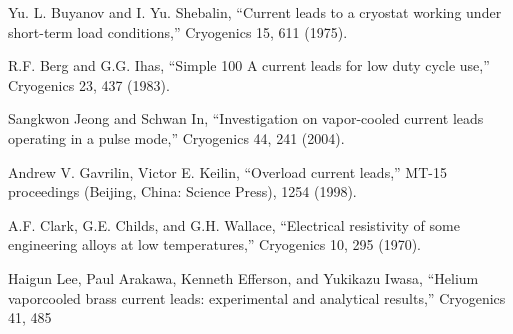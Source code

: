 \noindent [4.82] Yu. L. Buyanov and I. Yu. Shebalin, ``Current leads to a cryostat working under
short-term load conditions,” Cryogenics 15, 611 (1975).

\noindent [4.83] R.F. Berg and G.G. Ihas, ``Simple 100 A current leads for low duty cycle use,”
Cryogenics 23, 437 (1983).

\noindent [4.84] Sangkwon Jeong and Schwan In, ``Investigation on vapor-cooled current leads operating in a pulse mode,” Cryogenics 44, 241 (2004).

\noindent [4.85] Andrew V. Gavrilin, Victor E. Keilin, ``Overload current leads,” MT-15 proceedings (Beijing, China: Science Press), 1254 (1998).

\noindent [4.86] A.F. Clark, G.E. Childs, and G.H. Wallace, ``Electrical resistivity of some engineering alloys at low temperatures,” Cryogenics 10, 295 (1970).

\noindent [4.87] Haigun Lee, Paul Arakawa, Kenneth Efferson, and Yukikazu Iwasa, ``Helium vaporcooled brass current leads: experimental and analytical results,” Cryogenics 41, 485

